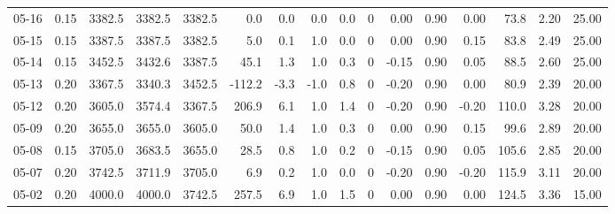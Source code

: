 \begin{threeparttable}
{\begin{tabular}{lrrrrrrrrrrrrrrr}
  05-16 &     0.15 & 3382.5 & 3382.5 & 3382.5 &        0.0 &            0.0 &                      0.0 &                 0.0 &              0 &       0.00 &      0.90 &           0.00 &             73.8 &            2.20 &                  25.00 \\
  05-15 &     0.15 & 3387.5 & 3387.5 & 3382.5 &        5.0 &            0.1 &                      1.0 &                 0.0 &              0 &       0.00 &      0.90 &           0.15 &             83.8 &            2.49 &                  25.00 \\
  05-14 &     0.15 & 3452.5 & 3432.6 & 3387.5 &       45.1 &            1.3 &                      1.0 &                 0.3 &              0 &      -0.15 &      0.90 &           0.05 &             88.5 &            2.60 &                  25.00 \\
  05-13 &     0.20 & 3367.5 & 3340.3 & 3452.5 &     -112.2 &           -3.3 &                     -1.0 &                 0.8 &              0 &      -0.20 &      0.90 &           0.00 &             80.9 &            2.39 &                  20.00 \\
  05-12 &     0.20 & 3605.0 & 3574.4 & 3367.5 &      206.9 &            6.1 &                      1.0 &                 1.4 &              0 &      -0.20 &      0.90 &          -0.20 &            110.0 &            3.28 &                  20.00 \\
  05-09 &     0.20 & 3655.0 & 3655.0 & 3605.0 &       50.0 &            1.4 &                      1.0 &                 0.3 &              0 &       0.00 &      0.90 &           0.15 &             99.6 &            2.89 &                  20.00 \\
  05-08 &     0.15 & 3705.0 & 3683.5 & 3655.0 &       28.5 &            0.8 &                      1.0 &                 0.2 &              0 &      -0.15 &      0.90 &           0.05 &            105.6 &            2.85 &                  20.00 \\
  05-07 &     0.20 & 3742.5 & 3711.9 & 3705.0 &        6.9 &            0.2 &                      1.0 &                 0.0 &              0 &      -0.20 &      0.90 &          -0.20 &            115.9 &            3.11 &                  20.00 \\
  05-02 &     0.20 & 4000.0 & 4000.0 & 3742.5 &      257.5 &            6.9 &                      1.0 &                 1.5 &              0 &       0.00 &      0.90 &           0.00 &            124.5 &            3.36 &                  15.00 \\

\end{tabular}}
\end{threeparttable}

